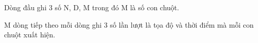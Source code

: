 Dòng đầu ghi 3 số N, D, M trong đó M là số con chuột.  

   M dòng tiếp theo mỗi dòng ghi 3 số lần lượt là tọa độ và thời điểm mà mỗi con chuột xuất hiện.  

\